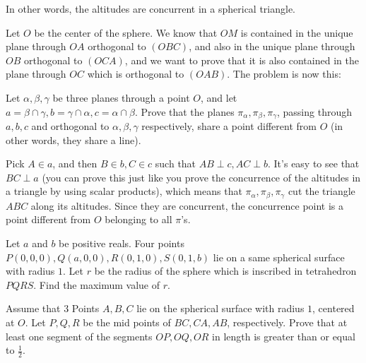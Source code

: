 \begin{solution}[name={Solution by Grobber}] 
	In other words, the altitudes are concurrent in a spherical triangle.
	
	Let $O$ be the center of the sphere. We know that $OM$ is contained in the unique plane through $OA$ orthogonal to $(OBC)$, and also in the unique plane through $OB$ orthogonal to $(OCA)$, and we want to prove that it is also contained in the plane through $OC$ which is orthogonal to $(OAB)$. The problem is now this:
	
	Let $\alpha,\beta,\gamma$ be three planes through a point $O$, and let $a=\beta\cap\gamma,b=\gamma\cap\alpha,c=\alpha\cap\beta$. Prove that the planes $\pi_\alpha,\pi_\beta,\pi_\gamma$, passing through $a,b,c$ and orthogonal to $\alpha,\beta,\gamma$ respectively, share a point different from $O$ (in other words, they share a line).
	
	Pick $A\in a$, and then $B\in b,C\in c$ such that $AB\perp c,AC\perp b$. It's easy to see that $BC\perp a$ (you can prove this just like you prove the concurrence of the altitudes in a triangle by using scalar products), which means that $\pi_\alpha,\pi_\beta,\pi_\gamma$ cut the triangle $ABC$ along its altitudes. Since they are concurrent, the concurrence point is a point different from $O$ belonging to all $\pi$'s.
\end{solution}





\begin{question}[name={1992 Tokyo University Entrance Exam}]
	Let $a$ and $b$ be positive reals. Four points $P(0,0,0),Q(a,0,0),R(0,1,0),S(0,1,b)$ lie on a same spherical surface with radius $1$. Let $r$ be the radius of the sphere which is inscribed in tetrahedron $PQRS$. Find the maximum value of $r$.
\end{question}



\begin{question}[name={1993 Kyoto University Entrance Exam}]
	Assume that $3$ Points $A,B,C$ lie on the spherical surface with radius $1$, centered at $O$. Let $P,Q,R$ be the mid points of $BC,CA,AB$, respectively. Prove that at least one segment of the segments $OP,OQ,OR$ in length is greater than or equal to $\frac{1}{2}$.
\end{question}



